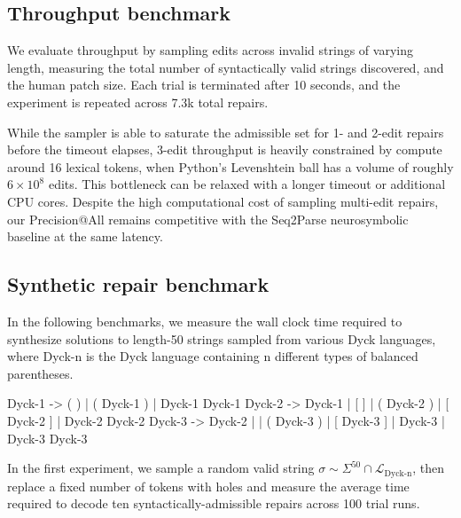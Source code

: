 \documentclass[sigplan,review,anonymous,acmsmall]{acmart}\settopmatter{printfolios=false,printccs=false,printacmref=false}
\begin{document}
\subsection{Throughput benchmark}

\begin{figure}
  \vspace{-10pt}
  \resizebox{.4\textwidth}{!}{}
  \label{fig:throughput}
\end{figure}

We evaluate throughput by sampling edits across invalid strings of varying length, measuring the total number of syntactically valid strings discovered, and the human patch size. Each trial is terminated after 10 seconds, and the experiment is repeated across 7.3k total repairs.

While the sampler is able to saturate the admissible set for 1- and 2-edit repairs before the timeout elapses, 3-edit throughput is heavily constrained by compute around 16 lexical tokens, when Python's Levenshtein ball has a volume of roughly $6\times 10^8$ edits. This bottleneck can be relaxed with a longer timeout or additional CPU cores. Despite the high computational cost of sampling multi-edit repairs, our Precision@All remains competitive with the Seq2Parse neurosymbolic baseline at the same latency.

\subsection{Synthetic repair benchmark}\label{sec:latency}

In the following benchmarks, we measure the wall clock time required to synthesize solutions to length-50 strings sampled from various Dyck languages, where Dyck-n is the Dyck language containing n different types of balanced parentheses.

\begin{wholetidyinput}
Dyck-1 -> ( ) | ( Dyck-1 ) | Dyck-1 Dyck-1
Dyck-2 -> Dyck-1 | [ ] | ( Dyck-2 ) | [ Dyck-2 ] | Dyck-2 Dyck-2
Dyck-3 -> Dyck-2 | { } | ( Dyck-3 ) | [ Dyck-3 ] | { Dyck-3 } | Dyck-3 Dyck-3
\end{wholetidyinput}

\noindent In the first experiment, we sample a random valid string $\sigma \sim \Sigma^{50} \cap \mathcal{L}_{\text{Dyck-n}}$, then replace a fixed number of tokens with holes and measure the average time required to decode ten syntactically-admissible repairs across 100 trial runs.
\end{document}
